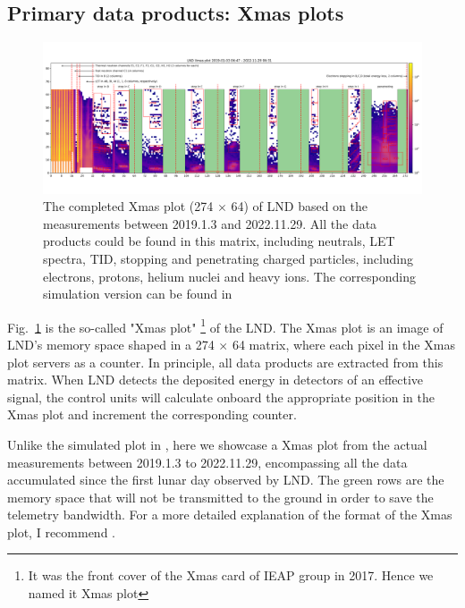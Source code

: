 \subsection*{Primary data products: Xmas plots}
\label{sec:xmas}

\begin{figure}
    \centering
    \includegraphics[width =0.95\textheight, height = 0.4\textheight, angle = 90]{images/xmas-2019-01-03To2022-11-29.png}
    \caption[\ac{LND} Xmas plot from measurements]{The completed Xmas plot (274 $\times$ 64) of \ac{LND} based on the measurements between 2019.1.3 and 2022.11.29. All the data products could be found in this matrix, including neutrals, \ac{LET} spectra, \ac{TID}, stopping and penetrating charged particles, including electrons, protons, helium nuclei and heavy ions. The corresponding simulation version can be found in \citet{Wimmer2020SSRv}}
    \label{Fig:measurement_Xmas}
\end{figure}

Fig.~\ref{Fig:measurement_Xmas} is the so-called "Xmas plot" \footnote{It was the front cover of the Xmas card of IEAP group in 2017. Hence we named it Xmas plot} of the \ac{LND}. The Xmas plot is an image of \ac{LND}'s memory space shaped in a 274 $\times$ 64 matrix, where each pixel in the Xmas plot servers as a counter. In principle, all data products are extracted from this matrix. 
When \ac{LND} detects the deposited energy in detectors of an effective signal, the control units will calculate onboard the appropriate position in the Xmas plot and increment the corresponding counter. 

Unlike the simulated plot in \citep{Wimmer2020SSRv}, here we showcase a Xmas plot from the actual measurements between 2019.1.3 to 2022.11.29, encompassing all the data accumulated since the first lunar day observed by \ac{LND}. The green rows are the memory space that will not be transmitted to the ground in order to save the telemetry bandwidth. 
For a more detailed explanation of the format of the Xmas plot, I recommend \citet{Wimmer2020SSRv}.



